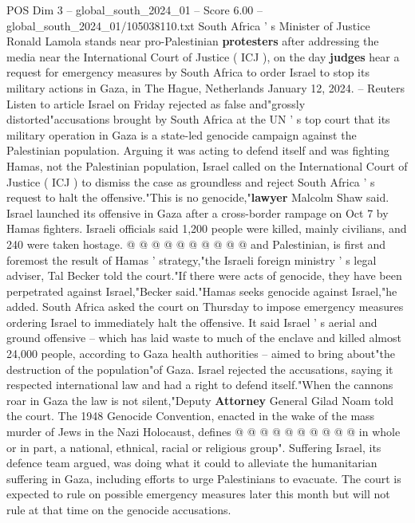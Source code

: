 \begin{textsample}{POS Dim 3 – global\_south\_2024\_01 – Score 6.00 – global\_south\_2024\_01/105038110.txt}  \label{ex:f3_pos_353}
South Africa ' s Minister of Justice Ronald Lamola stands near pro-Palestinian \textbf{protesters} after addressing the media near the International Court of Justice ( ICJ ), on the day \textbf{judges} hear a request for emergency measures by South Africa to order Israel to stop its military actions in Gaza, in The Hague, Netherlands January 12, 2024. -- Reuters Listen to article Israel on Friday rejected as false and"grossly distorted"accusations brought by South Africa at the UN ' s top court that its military operation in Gaza is a state-led genocide campaign against the Palestinian population.
Arguing it was acting to defend itself and was fighting Hamas, not the Palestinian population, Israel called on the International Court of Justice ( ICJ ) to dismiss the case as groundless and reject South Africa ' s request to halt the offensive."This is no genocide,"\textbf{lawyer} Malcolm Shaw said.
Israel launched its offensive in Gaza after a cross-border rampage on Oct 7 by Hamas fighters.
Israeli officials said 1,200 people were killed, mainly civilians, and 240 were taken hostage. @ @ @ @ @ @ @ @ @ @ and Palestinian, is first and foremost the result of Hamas ' strategy,"the Israeli foreign ministry ' s legal adviser, Tal Becker told the court."If there were acts of genocide, they have been perpetrated against Israel,"Becker said."Hamas seeks genocide against Israel,"he added.
South Africa asked the court on Thursday to impose emergency measures ordering Israel to immediately halt the offensive.
It said Israel ' s aerial and ground offensive -- which has laid waste to much of the enclave and killed almost 24,000 people, according to Gaza health authorities -- aimed to bring about"the destruction of the population"of Gaza.
Israel rejected the accusations, saying it respected international law and had a right to defend itself."When the cannons roar in Gaza the law is not silent,"Deputy \textbf{Attorney} General Gilad Noam told the court.
The 1948 Genocide Convention, enacted in the wake of the mass murder of Jews in the Nazi Holocaust, defines @ @ @ @ @ @ @ @ @ @ in whole or in part, a national, ethnical, racial or religious group".
Suffering Israel, its defence team argued, was doing what it could to alleviate the humanitarian suffering in Gaza, including efforts to urge Palestinians to evacuate.
The court is expected to rule on possible emergency measures later this month but will not rule at that time on the genocide accusations.

\end{textsample}
